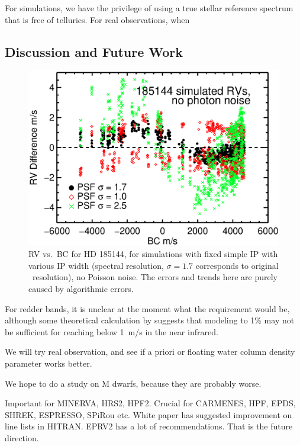 For simulations, we have the privilege of using a true stellar
reference spectrum that is free of tellurics. For real observations,
when 



\subsection{Discussion and Future Work}\label{keck:telluric:future}



\begin{figure}
\includegraphics[scale=0.65]{telluric/185144-rv-bc-rja01-rje01-rjf01.eps} 
\caption{RV vs.\ BC for HD 185144, for simulations with fixed simple
IP with various IP width (spectral resolution, $\sigma=1.7$
corresponds to original \keck\ resolution), no Poisson noise. The
errors and trends here are purely caused by algorithmic errors.
\label{telluric:fig:algorithm}}
\end{figure}


For redder bands, it is unclear at the moment what the requirement
would be, although some theoretical calculation by
\cite{2016AAS...22713719S} suggests that modeling to 1\% may not be
sufficient for reaching below 1~m/s in the near infrared.


We will try real observation, and see if a priori or floating water
column density parameter works better.

We hope to do a study on M dwarfs, because they are probably worse.

Important for MINERVA, HRS2, HPF2. Crucial for CARMENES, HPF, EPDS, SHREK,
ESPRESSO, SPiRou etc. White paper has suggested improvement on line
lists in HITRAN. EPRV2 has a lot of recommendations. That is the
future direction.
